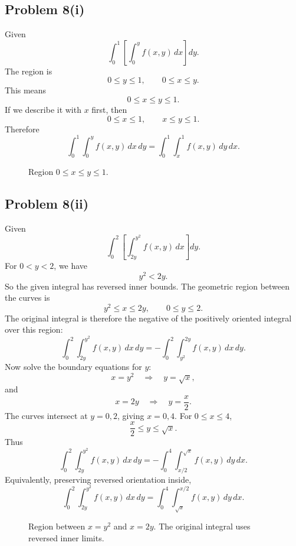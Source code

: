 \documentclass[11pt,a4paper]{article}
\begin{document}
\subsection{Problem 8(i)}
Given
\[
 \int_0^1\left[\int_0^y f(x,y)\,dx\right]dy.
\]
The region is
\[
 0\le y\le1,
\qquad 0\le x\le y.
\]
This means
\[
 0\le x\le y\le1.
\]
If we describe it with \(x\) first, then
\[
 0\le x\le1,
\qquad x\le y\le1.
\]
Therefore
\[
\boxed{\int_0^1\int_0^y f(x,y)\,dx\,dy
=\int_0^1\int_x^1f(x,y)\,dy\,dx.}
\]

\begin{figure}[H]
\centering
{}
\caption{Region \(0\le x\le y\le1\).}
\end{figure}

\subsection{Problem 8(ii)}
Given
\[
 \int_0^2\left[\int_{2y}^{y^2} f(x,y)\,dx\right]dy.
\]
For \(0<y<2\), we have
\[
 y^2<2y.
\]
So the given integral has reversed inner bounds.  The geometric region between the curves is
\[
 y^2\le x\le2y,
\qquad 0\le y\le2.
\]
The original integral is therefore the negative of the positively oriented integral over this region:
\[
 \int_0^2\int_{2y}^{y^2}f(x,y)\,dx\,dy
 =-\int_0^2\int_{y^2}^{2y}f(x,y)\,dx\,dy.
\]
Now solve the boundary equations for \(y\):
\[
 x=y^2\quad\Longrightarrow\quad y=\sqrt{x},
\]
and
\[
 x=2y\quad\Longrightarrow\quad y=\frac{x}{2}.
\]
The curves intersect at \(y=0,2\), giving \(x=0,4\).  For \(0\le x\le4\),
\[
 \frac{x}{2}\le y\le\sqrt{x}.
\]
Thus
\[
\boxed{\int_0^2\int_{2y}^{y^2}f(x,y)\,dx\,dy
=-\int_0^4\int_{x/2}^{\sqrt{x}}f(x,y)\,dy\,dx.}
\]
Equivalently, preserving reversed orientation inside,
\[
\boxed{\int_0^2\int_{2y}^{y^2}f(x,y)\,dx\,dy
=\int_0^4\int_{\sqrt{x}}^{x/2}f(x,y)\,dy\,dx.}
\]

\begin{figure}[H]
\centering
{}
\caption{Region between \(x=y^2\) and \(x=2y\).  The original integral uses reversed inner limits.}
\end{figure}
\end{document}
